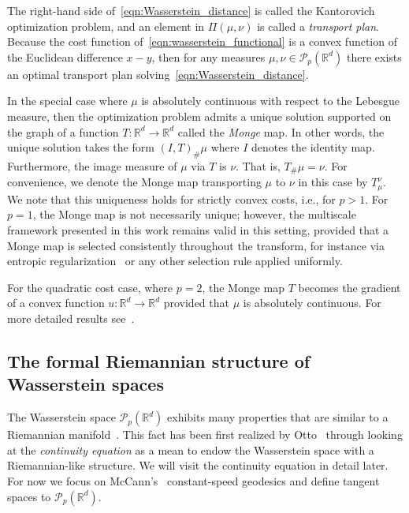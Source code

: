 \documentclass[12pt]{amsart}
\begin{document}
The right-hand side of~\eqref{eqn:Wasserstein_distance} is called the Kantorovich optimization problem, and an element in $\Pi(\mu,\nu)$ is called a \emph{transport plan}. Because the cost function of~\eqref{eqn:wasserstein_functional} is a convex function of the Euclidean difference $x-y$, then for any measures $\mu,\nu\in\mathcal{P}_p(\mathbb{R}^d)$ there exists an optimal transport plan solving~\eqref{eqn:Wasserstein_distance}.

In the special case where $\mu$ is absolutely continuous with respect to the Lebesgue measure, then the optimization problem admits a unique solution supported on the graph of a function $T:\mathbb{R}^d\rightarrow\mathbb{R}^d$ called the \emph{Monge} map. In other words, the unique solution takes the form $(I, T)_{\#}\mu$ where $I$ denotes the identity map. Furthermore, the image measure of $\mu$ via $T$ is $\nu$. That is, $T_{\#}\mu=\nu$. For convenience, we denote the Monge map transporting $\mu$ to $\nu$ in this case by $T_\mu^\nu$. We note that this uniqueness holds for strictly convex costs, i.e., for $p > 1$. For $p = 1$, the Monge map is not necessarily unique; however, the multiscale framework presented in this work remains valid in this setting, provided that a Monge map is selected consistently throughout the transform, for instance via entropic regularization~\cite{peyre2019computational} or any other selection rule applied uniformly.

For the quadratic cost case, where $p=2$, the Monge map $T$ becomes the gradient of a convex function $u:\mathbb{R}^d\to\mathbb{R}^d$ provided that $\mu$ is absolutely continuous. For more detailed results see~\cite{santambrogio2015optimal, ambrosio2008gradient}.

\subsection{The formal Riemannian structure of Wasserstein spaces}

The Wasserstein space $\mathcal{P}_p(\mathbb{R}^d)$ exhibits many properties that are similar to a Riemannian manifold~\cite{panaretos2020invitation}. This fact has been first realized by Otto~\cite{Otto31012001} through looking at the \emph{continuity equation} as a mean to endow the Wasserstein space with a Riemannian-like structure. We will visit the continuity equation in detail later. For now we focus on McCann's~\cite{mccann1997convexity} constant-speed geodesics and define tangent spaces to $\mathcal{P}_p(\mathbb{R}^d)$.
\end{document}
